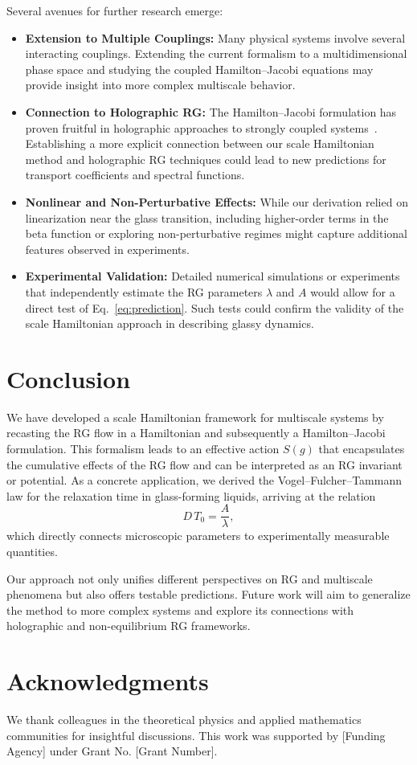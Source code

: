 \documentclass[12pt]{article}
\begin{document}
Several avenues for further research emerge:
\begin{itemize}
    \item \textbf{Extension to Multiple Couplings:} Many physical systems involve several interacting couplings. Extending the current formalism to a multidimensional phase space and studying the coupled Hamilton--Jacobi equations may provide insight into more complex multiscale behavior.
    \item \textbf{Connection to Holographic RG:} The Hamilton--Jacobi formulation has proven fruitful in holographic approaches to strongly coupled systems~\cite{deBoer1999holographic}. Establishing a more explicit connection between our scale Hamiltonian method and holographic RG techniques could lead to new predictions for transport coefficients and spectral functions.
    \item \textbf{Nonlinear and Non-Perturbative Effects:} While our derivation relied on linearization near the glass transition, including higher-order terms in the beta function or exploring non-perturbative regimes might capture additional features observed in experiments.
    \item \textbf{Experimental Validation:} Detailed numerical simulations or experiments that independently estimate the RG parameters \(\lambda\) and \(A\) would allow for a direct test of Eq.~\eqref{eq:prediction}. Such tests could confirm the validity of the scale Hamiltonian approach in describing glassy dynamics.
\end{itemize}

\section{Conclusion} \label{sec:conclusion}
We have developed a scale Hamiltonian framework for multiscale systems by recasting the RG flow in a Hamiltonian and subsequently a Hamilton--Jacobi formulation. This formalism leads to an effective action \(S(g)\) that encapsulates the cumulative effects of the RG flow and can be interpreted as an RG invariant or potential. As a concrete application, we derived the Vogel--Fulcher--Tammann law for the relaxation time in glass-forming liquids, arriving at the relation
\[
D\,T_0 = \frac{A}{\lambda},
\]
which directly connects microscopic parameters to experimentally measurable quantities.

Our approach not only unifies different perspectives on RG and multiscale phenomena but also offers testable predictions. Future work will aim to generalize the method to more complex systems and explore its connections with holographic and non-equilibrium RG frameworks.

\section*{Acknowledgments}
We thank colleagues in the theoretical physics and applied mathematics communities for insightful discussions. This work was supported by [Funding Agency] under Grant No. [Grant Number].


\end{document}

